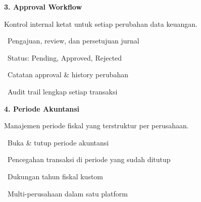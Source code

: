 \documentclass[a4paper]{article}
\begin{document}
\vspace{8pt}

\noindent
\begin{minipage}[t]{0.485\textwidth}
    \colorbox{EmeraldDark}{%
        \begin{minipage}{\dimexpr\textwidth-14pt}
            \vspace{5pt}
            {\fontsize{10}{13}\selectfont\bfseries\color{White} 3. Approval Workflow}
            \vspace{5pt}
        \end{minipage}}
    \vspace{5pt}
    {\fontsize{9}{12}\selectfont\color{TextDark}%
    Kontrol internal ketat untuk setiap perubahan data keuangan.\par\vspace{3pt}
    \textbullet\ Pengajuan, review, dan persetujuan jurnal\par\vspace{2pt}%
    \textbullet\ Status: Pending, Approved, Rejected\par\vspace{2pt}%
    \textbullet\ Catatan approval \& history perubahan\par\vspace{2pt}%
    \textbullet\ Audit trail lengkap setiap transaksi}%
\end{minipage}%
\hfill
\begin{minipage}[t]{0.485\textwidth}
    \colorbox{PurplePrimary}{%
        \begin{minipage}{\dimexpr\textwidth-14pt}
            \vspace{5pt}
            {\fontsize{10}{13}\selectfont\bfseries\color{White} 4. Periode Akuntansi}
            \vspace{5pt}
        \end{minipage}}
    \vspace{5pt}
    {\fontsize{9}{12}\selectfont\color{TextDark}%
    Manajemen periode fiskal yang terstruktur per perusahaan.\par\vspace{3pt}
    \textbullet\ Buka \& tutup periode akuntansi\par\vspace{2pt}%
    \textbullet\ Pencegahan transaksi di periode yang sudah ditutup\par\vspace{2pt}%
    \textbullet\ Dukungan tahun fiskal kustom\par\vspace{2pt}%
    \textbullet\ Multi-perusahaan dalam satu platform}%
\end{minipage}
\end{document}
